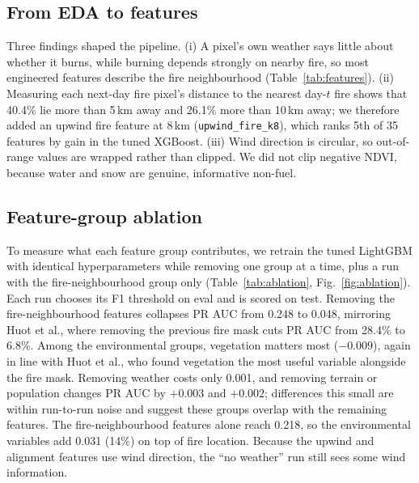 \subsection{From EDA to features}
Three findings shaped the pipeline. (i) A pixel's own weather says little about whether it burns,
while burning depends strongly on nearby fire, so most engineered features describe the fire
neighbourhood (Table~\ref{tab:features}). (ii) Measuring each next-day fire pixel's distance to the
nearest day-$t$ fire shows that 40.4\% lie more than 5\,km away and 26.1\% more than 10\,km away;
we therefore added an upwind fire feature at 8\,km (\texttt{upwind\_fire\_k8}), which ranks 5th of
35 features by gain in the tuned XGBoost. (iii) Wind direction is circular, so out-of-range values
are wrapped rather than clipped. We did not clip negative NDVI, because water and snow are genuine,
informative non-fuel.

\subsection{Feature-group ablation}
To measure what each feature group contributes, we retrain the tuned LightGBM with identical
hyperparameters while removing one group at a time, plus a run with the fire-neighbourhood group
only (Table~\ref{tab:ablation}, Fig.~\ref{fig:ablation}). Each run chooses its F1 threshold on eval
and is scored on test. Removing the fire-neighbourhood features collapses PR AUC from 0.248 to 0.048,
mirroring Huot et al., where removing the previous fire mask cuts PR AUC from 28.4\% to 6.8\%.
Among the environmental groups, vegetation matters most ($-0.009$), again in line with Huot et al.,
who found vegetation the most useful variable alongside the fire mask. Removing weather costs only
0.001, and removing terrain or population changes PR AUC by $+0.003$ and $+0.002$; differences this
small are within run-to-run noise and suggest these groups overlap with the remaining features.
The fire-neighbourhood features alone reach 0.218, so the environmental variables add 0.031
(14\%) on top of fire location. Because the upwind and alignment features use wind direction,
the ``no weather'' run still sees some wind information.

